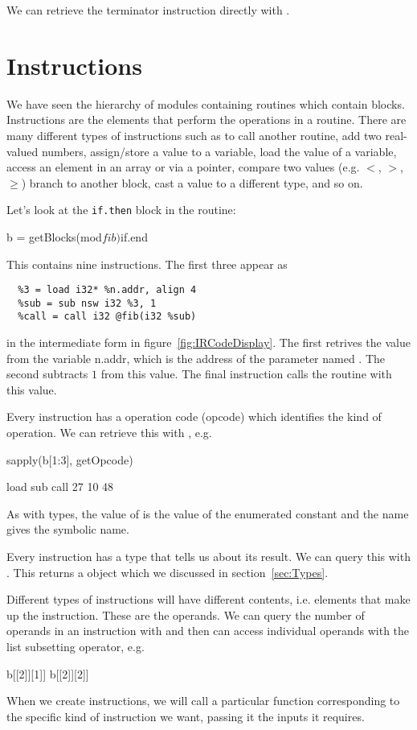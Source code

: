 We can retrieve the terminator instruction directly with
.

\section{Instructions}
We have seen the hierarchy of modules containing routines which
contain blocks.  Instructions are the elements that perform the
operations in a routine.  There are many different types of
instructions such as to call another routine,
add two real-valued numbers, assign/store
a value to a variable, load the value of a variable,
access an element in an array or via a pointer,
compare two values (e.g. $<$, $>$, $\ge$)
branch to another block, cast a value to a different type, and so on.

Let's look at the \texttt{if.then} block in the
 routine:
\begin{RCode}
b = getBlocks(mod$fib)$if.end
\end{RCode}
This contains nine instructions.
The first three appear as 
\begin{Verbatim}
  %3 = load i32* %n.addr, align 4
  %sub = sub nsw i32 %3, 1
  %call = call i32 @fib(i32 %sub)  
\end{Verbatim}
in the intermediate form in figure~\ref{fig:IRCodeDisplay}.
The first retrives the value from the variable n.addr, which 
is the address of the parameter named .
The second subtracts $1$ from this value.
The final instruction calls the  routine with this value.

Every instruction has a operation code (opcode) which identifies
the kind of operation. We can retrieve this with ,
e.g.
\begin{RCode}
sapply(b[1:3], getOpcode)
\end{RCode}
\begin{ROutput}
load  sub call 
  27   10   48   
\end{ROutput}
As with types, the value of  is the value of the
\C{} enumerated constant and the name gives the symbolic name.


Every instruction has a type that tells us about its result. 
We can query this with . This returns a
 object which we discussed in section~\ref{sec:Types}.

Different types of instructions will have different contents,
i.e. elements that make up the instruction.
These are the operands.
We can query the number of operands in an instruction with 
and then can access individual operands with the  list subsetting
operator, e.g.
\begin{RCode}
b[[2]][1]]
b[[2]][2]]
\end{RCode}
When we create instructions, we will call a particular
function corresponding to the specific kind of instruction
we want, passing it the inputs it requires.


